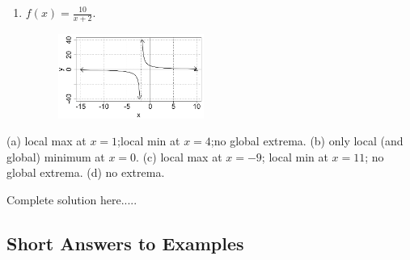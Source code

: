 \begin{example}
\begin{enumerate}[leftmargin=*]
\begin{figure}[h!]
        \label{fig:exampleGraph4}
    \end{figure}
     \vspace{1in}
    \item $f(x)=\displaystyle\frac{10}{x+2}$. %
    \begin{figure}[h!]
        \includegraphics[width=0.45\textwidth,inner]{images/optimization/exampleGraph5.png}
        \label{fig:exampleGraph5}
    \end{figure}
     \vspace{1in}
\end{enumerate}
    
    \begin{sol}
    (a) local max at $x=1$;local min at $x=4$;no global extrema. (b) only local (and global) minimum at $x=0$. (c) local max at $x=-9$; local min at $x=11$; no global extrema. (d) no extrema.
    \end{sol}
    \begin{solL}
    Complete solution here.....
    
    \end{solL}
    
\end{example}







\vspace*{\fill}
\subsection*{Short Answers to Examples}






